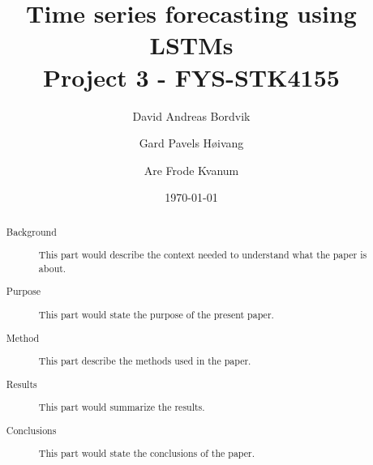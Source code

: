 \documentclass
[twocolumn,
secnumarabic,
nobibnotes,
aps,
prl,
reprint,
groupedaddress,
amsmath,
amssymb,
]{revtex4-2}
\begin{document}

\title{Time series forecasting using LSTMs \\ Project 3 - FYS-STK4155}
\author{David Andreas Bordvik}
\author{Gard Pavels Høivang}
\author{Are Frode Kvanum}

\date{\today}

\begin{abstract}
  \begin{description}
  \item[Background] This part would describe the
  context needed to understand what the paper
  is about.
  \item[Purpose] This part would state the purpose
  of the present paper.
  \item[Method] This part describe the methods
  used in the paper.
  \item[Results] This part would summarize the
  results.
  \item[Conclusions] This part would state the
  conclusions of the paper.
  \end{description}
\end{abstract}

\maketitle
\end{document}
